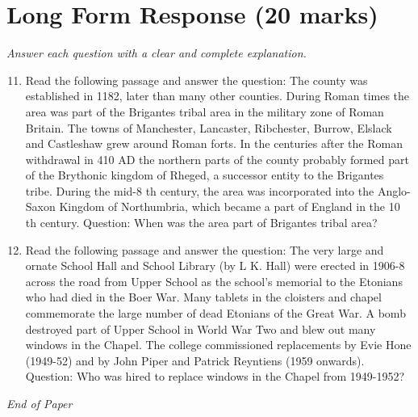 \documentclass[12pt]{article}
\begin{document}
\section*{Long Form Response (20 marks)}
\textit{Answer each question with a clear and complete explanation.}
\begin{enumerate}[label=\arabic*.]
\setcounter{enumi}{10}
\item Read the following passage and answer the question: The county was established in 1182, later than many other counties. During Roman times the area was part of the Brigantes tribal area in the military zone of Roman Britain. The towns of Manchester, Lancaster, Ribchester, Burrow, Elslack and Castleshaw grew around Roman forts. In the centuries after the Roman withdrawal in 410 AD the northern parts of the county probably formed part of the Brythonic kingdom of Rheged, a successor entity to the Brigantes tribe. During the mid-8 th century, the area was incorporated into the Anglo-Saxon Kingdom of Northumbria, which became a part of England in the 10 th century. Question: When was the area part of Brigantes tribal area?
\item Read the following passage and answer the question: The very large and ornate School Hall and School Library (by L K. Hall) were erected in 1906-8 across the road from Upper School as the school's memorial to the Etonians who had died in the Boer War. Many tablets in the cloisters and chapel commemorate the large number of dead Etonians of the Great War. A bomb destroyed part of Upper School in World War Two and blew out many windows in the Chapel. The college commissioned replacements by Evie Hone (1949-52) and by John Piper and Patrick Reyntiens (1959 onwards). Question: Who was hired to replace windows in the Chapel from 1949-1952?
\end{enumerate}

\vfill
\noindent\textit{End of Paper}
\end{document}

